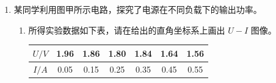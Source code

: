 \begin{enumerate}





\item
{}
某同学利用图甲所示电路，探究了电源在不同负载下的输出功率。
\begin{figure}[h!]
\centering

\end{figure}

\begin{enumerate}
\item
所得实验数据如下表，请在给出的直角坐标系上画出 $ U-I $ 图像。
\begin{table}[h!]
\centering 
\begin{tabular}{|c|c|c|c|c|c|c|}
\hline 
$ U/V $ & 1.96 & 1.86 & 1.80 & 1.84 & 1.64 & 1.56
 \\
\hline
$ I/A $ & 0.05 & 0.15 & 0.25 & 0.35 & 0.45 & 0.55\\ 
\hline 
\end{tabular}
\end{table} 
\begin{figure}[h!]
\centering

\end{figure}





\end{enumerate}
\end{enumerate}
